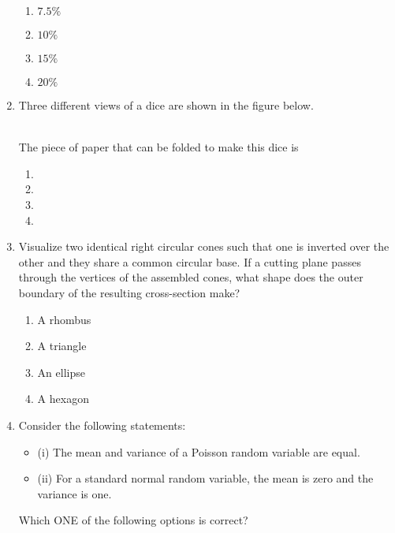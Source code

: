 \documentclass[journal,12pt,onecolumn]{IEEEtran}
\theoremstyle{remark}
\begin{document}
\begin{enumerate}
\begin{enumerate}
    \item $7.5\%$
    \item $10\%$
    \item $15\%$
    \item $20\%$
\end{enumerate}
\item Three different views of a dice are shown in the figure below.\\
\noindent %
\begin{minipage}{0.33\textwidth}
    \centering
\end{minipage}%
\begin{minipage}{0.33\textwidth}
    \centering
\end{minipage}%
\begin{minipage}{0.33\textwidth}
    \centering
\end{minipage}\\
The piece of paper that can be folded to make this dice is
\begin{enumerate}
	\item 
	\item 
	\item 
	\item 
	\end{enumerate}
\item Visualize two identical right circular cones such that one is inverted over the other and they share a common circular base. If a cutting plane passes through the vertices of the assembled cones, what shape does the outer boundary of the resulting cross-section make?
\begin{enumerate}
    \item A rhombus
    \item A triangle
    \item An ellipse
    \item A hexagon
\end{enumerate}
\item Consider the following statements:
\begin{itemize}
	\item (i) The mean and variance of a Poisson random variable are equal.
	\item (ii) For a standard normal random variable, the mean is zero and the variance is one.
\end{itemize}
Which ONE of the following options is correct?


\end{enumerate}
\end{document}
